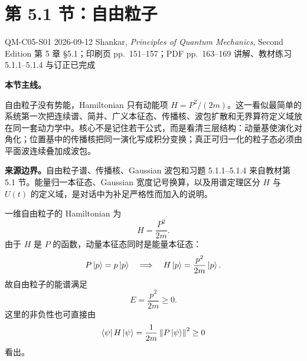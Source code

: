 
\section{第 5.1 节：自由粒子}
\label{section:QM-C05-S01}

\studymeta
  {QM-C05-S01}
  {2026-09-12}
  {Shankar, \textit{Principles of Quantum Mechanics}, Second Edition}
  {第 5 章 \S 5.1；印刷页 pp.~151--157；PDF pp.~163--169}
  {讲解、教材练习 5.1.1--5.1.4 与订正已完成}

\textbf{本节主线。}

自由粒子没有势能，Hamiltonian 只有动能项 $H=P^2/(2m)$。这一看似最简单的系统第一次把连续谱、简并、广义本征态、传播核、波包扩散和无界算符定义域放在同一套动力学中。核心不是记住若干公式，而是看清三层结构：动量基使演化对角化；位置基中的传播核把同一演化写成积分变换；真正可归一化的粒子态必须由平面波连续叠加成波包。

\textbf{来源边界。}自由粒子谱、传播核、Gaussian 波包和习题 5.1.1--5.1.4 来自教材第 5.1 节。能量归一本征态、Gaussian 宽度记号换算，以及用谱定理区分 $H$ 与 $U(t)$ 的定义域，是对话中为补足严格性而加入的说明。



一维自由粒子的 Hamiltonian 为
\begin{equation}
  H=\frac{P^2}{2m}.
  \label{eq:QM-C05-S01-free-hamiltonian}
\end{equation}
由于 $H$ 是 $P$ 的函数，动量本征态同时是能量本征态：
\begin{equation}
  P\left|p\right\rangle=p\left|p\right\rangle
  \quad\Longrightarrow\quad
  H\left|p\right\rangle=\frac{p^2}{2m}\left|p\right\rangle.
  \label{eq:QM-C05-S01-momentum-energy}
\end{equation}
故自由粒子的能谱满足
\begin{equation}
  E=\frac{p^2}{2m}\geq 0.
  \label{eq:QM-C05-S01-energy-spectrum}
\end{equation}
这里的非负性也可直接由
\begin{equation}
  \left\langle \psi\right|H\left|\psi\right\rangle
  =\frac{1}{2m}\left\lVert P\left|\psi\right\rangle \right\rVert^2\geq 0
  \label{eq:QM-C05-S01-positive-hamiltonian}
\end{equation}
看出。

